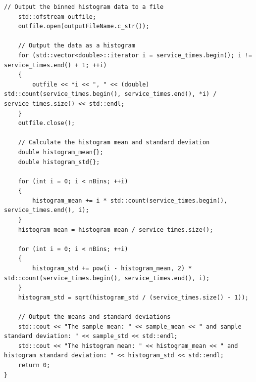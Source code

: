 \begin{lstlisting}[style=CStyle]
	// Output the binned histogram data to a file
	std::ofstream outfile;
	outfile.open(outputFileName.c_str());
	
	// Output the data as a histogram
	for (std::vector<double>::iterator i = service_times.begin(); i != service_times.end() + 1; ++i)
	{
		outfile << *i << ", " << (double) std::count(service_times.begin(), service_times.end(), *i) / service_times.size() << std::endl;
	}
	outfile.close();
	
	// Calculate the histogram mean and standard deviation
	double histogram_mean{};
	double histogram_std{};
	
	for (int i = 0; i < nBins; ++i)
	{
		histogram_mean += i * std::count(service_times.begin(), service_times.end(), i);
	}
	histogram_mean = histogram_mean / service_times.size();

	for (int i = 0; i < nBins; ++i)
	{
		histogram_std += pow(i - histogram_mean, 2) * std::count(service_times.begin(), service_times.end(), i);
	}
	histogram_std = sqrt(histogram_std / (service_times.size() - 1));
	
	// Output the means and standard deviations
	std::cout << "The sample mean: " << sample_mean << " and sample standard deviation: " << sample_std << std::endl;
	std::cout << "The histogram mean: " << histogram_mean << " and histogram standard deviation: " << histogram_std << std::endl;
	return 0;
}
\end{lstlisting}